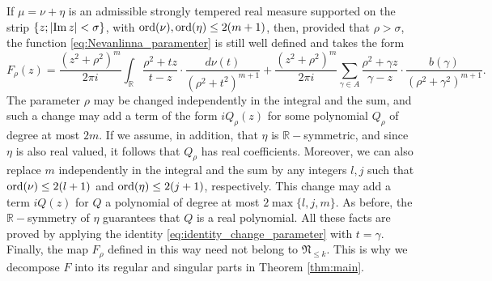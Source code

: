 \documentclass[a4paper,reqno,12pt]{amsart}
\newcommand{\NN}{\mathfrak{N}}
\renewcommand{\r}{\mathbb{R}}
\newcommand{\ga}{\gamma}
\newcommand{\ord}{{\rm ord}}
\newcommand{\cd}{\cdot}
\newcommand{\1}{{\bf 1}}
\renewcommand{\Im}{{\rm Im}\,}
\begin{document}
If $\mu=\nu+\eta$ is an admissible strongly tempered real measure supported on the strip $\{z;|\Im{z}|<\sigma\}$, with $\ord(\nu),\ord(\eta)\leq 2(m+1)$, then, provided that $\rho>\sigma$, the function \eqref{eq:Nevanlinna_paramenter} is still well defined and takes the form
\begin{equation}
\label{eq:Nevanlinna_F_rho}
    F_\rho(z)= \frac{(z^2+\rho^2)^m}{2\pi i} \int_{\r} \frac{\rho^2+tz}{t-z}\cd\frac{d\nu(t)}{(\rho^2+t^2)^{m+1}}+\frac{(z^2+\rho^2)^m}{2\pi i} \sum_{\ga\in A} \frac{\rho^2+\ga z}{\ga-z}\cd\frac{b(\ga)}{(\rho^2+\ga^2)^{m+1}}.
\end{equation}
The parameter $\rho$ may be changed independently in the integral and the sum, and such a change may add a term of the form $iQ_\rho(z)$ for some polynomial $Q_\rho$ of degree at most $2m$. If we assume, in addition, that $\eta$ is $\r-$symmetric, and since $\eta$ is also real valued, it follows that $Q_\rho$ has real coefficients. Moreover, we can also replace $m$ independently in the integral and the sum by any integers $l,j$ such that $\ord(\nu)\leq2(l+1)$ and $\ord(\eta)\leq2(j+1)$, respectively. This change may add a term $iQ(z)$ for $Q$ a polynomial of degree at most $2\max\{l,j,m\}$. As before, the $\r-$symmetry of $\eta$ guarantees that $Q$ is a real polynomial. All these facts are proved by applying the identity \eqref{eq:identity_change_parameter} with $t=\ga$. Finally, the map $F_\rho$ defined in this way need not belong to $\NN_{\leq k}$. This is why we decompose $F$ into its regular and singular parts in Theorem \ref{thm:main}.
\end{document}
